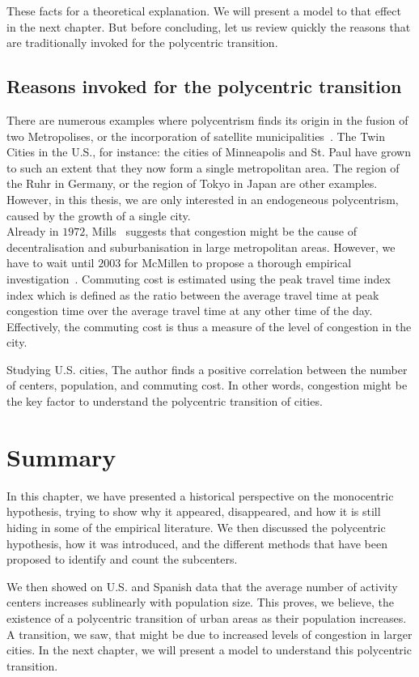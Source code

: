 These facts for a theoretical explanation. We will present a model to that
effect in the next chapter. But before concluding, let us review quickly the
reasons that are traditionally invoked for the polycentric transition.

\subsection{Reasons invoked for the polycentric transition}
\label{sec:reasons_invoked_for_the_polycentric_transition}

There are numerous examples where polycentrism finds its origin in the fusion of
two Metropolises, or the incorporation of satellite
municipalities~\cite{LeNechet:2015}. The Twin Cities in the U.S., for instance:
the cities of Minneapolis and St. Paul have grown to such an extent that they now
form a single metropolitan area. The region of the Ruhr in Germany, or the
region of Tokyo in Japan are other examples. However, in this thesis, we are only interested in
an endogeneous polycentrism, caused by the growth of a single city.\\

Already in $1972$, Mills~\cite{Mills:1972} suggests that congestion might be the
cause of decentralisation and suburbanisation in large metropolitan areas.
However, we have to wait until $2003$ for McMillen to propose a thorough
empirical investigation~\cite{McMillen:2003}. Commuting cost is estimated using the peak travel time index index which is
defined as the ratio between the average travel time at peak congestion time
over the average travel time at any other time of the day. Effectively, the
commuting cost is thus a measure of the level of congestion in the city. 

Studying U.S. cities, The author finds a positive correlation between the number
of centers, population, and commuting cost.  In other words, congestion might be
the key factor to understand the polycentric transition of cities.



\section{Summary}
\label{sec:summary}

In this chapter, we have presented a historical perspective on the monocentric
hypothesis, trying to show why it appeared, disappeared, and how it is still hiding in 
some of the empirical literature. We then discussed the polycentric hypothesis,
how it was introduced, and the different methods that have been proposed to
identify and count the subcenters.

We then showed on U.S. and Spanish data that the average number of activity
centers increases sublinearly with population size. This proves, we believe, the
existence of a polycentric transition of urban areas as their population
increases. A transition, we saw, that might be due to increased levels of
congestion in larger cities. In the next chapter, we will present a model to
understand this polycentric transition. 
